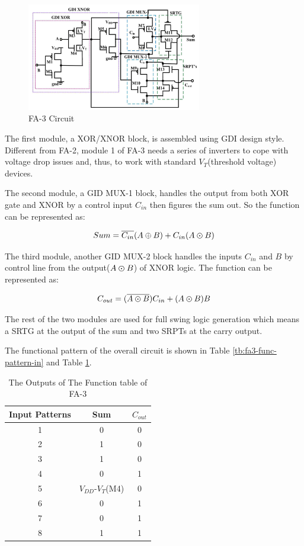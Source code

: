 \documentclass[conference]{IEEEtran}
\begin{document}
\begin{figure}[!hb]
	\centering
	\includegraphics[width=3in]{fa3-circuit.png}
	\caption{FA-3 Circuit}
	\label{fig:fa3-circuit}
\end{figure}

The first module, a XOR/XNOR block, is assembled using GDI design style.
Different from FA-2, module 1 of FA-3 needs a series of inverters to cope with voltage drop issues and, thus, to work with standard \(V_T\)(threshold voltage) devices.

The second module, a GID MUX-1 block, handles the output from both XOR gate and XNOR by a control input \(C_{in}\) then figures the sum out.
So the function can be represented as:

\[
	Sum = \overline{C_{in}}(A \oplus B) + C_{in}(A \varodot B)
\]

The third module, another GID MUX-2 block handles the inputs \(C_{in}\) and \(B\) by control line from the output(\(A \varodot B\)) of XNOR logic.
The function can be represented as:

\[
	C_{out} = (\overline{A \varodot B})C_{in} + (A \varodot B)B
\]

The rest of the two modules are used for full swing logic generation which means a SRTG at the output of the sum and two SRPTs at the carry output.

The functional pattern of the overall circuit is shown in Table \ref{tb:fa3-func-pattern-in} and Table \ref{tb:fa3-func-pattern-out}.

\begin{table}[!ht]
	\renewcommand{\arraystretch}{1.3}
	\caption{The Outputs of The Function table of FA-3}
	\centering
	\begin{tabular}{ c c c }
		\hline
		Input Patterns & Sum                    & \(C_{out}\) \\
		\hline
		1              & 0                      & 0           \\
		2              & 1                      & 0           \\
		3              & 1                      & 0           \\
		4              & 0                      & 1           \\
		5              & \(V_{DD}\)-\(V_T\)(M4) & 0           \\
		6              & 0                      & 1           \\
		7              & 0                      & 1           \\
		8              & 1                      & 1           \\
		\hline
	\end{tabular}
	\label{tb:fa3-func-pattern-out}
\end{table}
\end{document}
